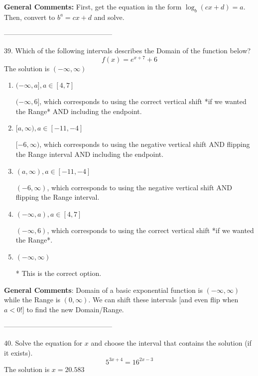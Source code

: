 \documentclass{extbook}[14pt]
\begin{document}
\textbf{General Comments:} First, get the equation in the form $\log_b{(cx+d)} = a$. Then, convert to $b^a = cx+d$ and solve.

-----------------------------------------------

39. Which of the following intervals describes the Domain of the function below?
\[ f(x) = e^{x+7}+6 \] 
The solution is $ (-\infty, \infty) $ 

\begin{enumerate}[label=\Alph*.] 
\item $ (-\infty, a], a \in [4, 7] $ 

 $(-\infty, 6]$, which corresponds to using the correct vertical shift *if we wanted the Range* AND including the endpoint. 
\item $ [a, \infty), a \in [-11, -4] $ 

 $[-6, \infty)$, which corresponds to using the negative vertical shift AND flipping the Range interval AND including the endpoint. 
\item $ (a, \infty), a \in [-11, -4] $ 

 $(-6, \infty)$, which corresponds to using the negative vertical shift AND flipping the Range interval. 
\item $ (-\infty, a), a \in [4, 7] $ 

 $(-\infty, 6)$, which corresponds to using the correct vertical shift *if we wanted the Range*. 
\item $ (-\infty, \infty) $ 

 * This is the correct option. 
\end{enumerate} 
 
\textbf{General Comments}: Domain of a basic exponential function is $(-\infty, \infty)$ while the Range is $(0, \infty)$. We can shift these intervals [and even flip when $a<0$!] to find the new Domain/Range.

-----------------------------------------------

40. Solve the equation for $x$ and choose the interval that contains the solution (if it exists).
\[ 5^{3x+4} = 16^{2x-3} \] 
The solution is $ x = 20.583 $ 
\end{document}
